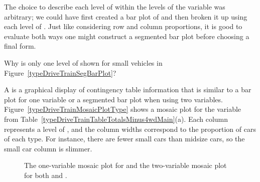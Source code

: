 The choice to describe each level of  within the levels of the  variable was arbitrary; we could have first created a bar plot of  and then broken it up using each level of . Just like considering row and column proportions, it is good to evaluate both ways one might construct a segmented bar plot before choosing a final form.


\begin{exercise}
Why is only one level of  shown for small vehicles in Figure~\ref{typeDriveTrainSegBarPlot}? %
\end{exercise}


A  is a graphical display of contingency table information that is similar to a bar plot for one variable or a segmented bar plot when using two variables. 
Figure~\ref{typeDriveTrainMosaicPlotType} shows a mosaic plot for the  variable from Table~\ref{typeDriveTrainTableTotalsMinus4wdMain}(a). Each column represents a level of , and the column widths correspond to the proportion of cars of each type. For instance, there are fewer small cars than midsize cars, so the small car column is slimmer.
\begin{figure}[p]
\centering
{}
\caption{The one-variable mosaic plot for  and the two-variable mosaic plot for both  and .}
\label{typeDriveTrainMosaicPlot}
\end{figure}

